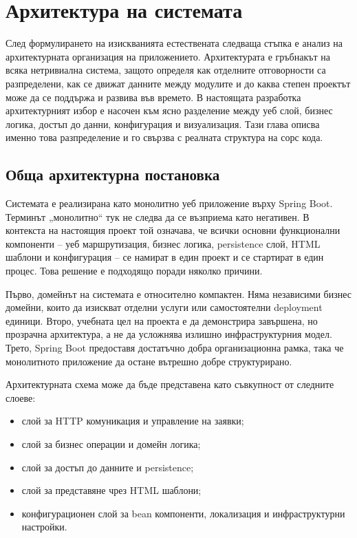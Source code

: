\section{Архитектура на системата}

След формулирането на изискванията естествената следваща стъпка е анализ на архитектурната организация на приложението. Архитектурата е гръбнакът на всяка нетривиална система, защото определя как отделните отговорности са разпределени, как се движат данните между модулите и до каква степен проектът може да се поддържа и развива във времето. В настоящата разработка архитектурният избор е насочен към ясно разделение между уеб слой, бизнес логика, достъп до данни, конфигурация и визуализация. Тази глава описва именно това разпределение и го свързва с реалната структура на сорс кода.

\subsection{Обща архитектурна постановка}

Системата е реализирана като монолитно уеб приложение върху Spring Boot. Терминът „монолитно“ тук не следва да се възприема като негативен. В контекста на настоящия проект той означава, че всички основни функционални компоненти -- уеб маршрутизация, бизнес логика, persistence слой, HTML шаблони и конфигурация -- се намират в един проект и се стартират в един процес. Това решение е подходящо поради няколко причини.

Първо, домейнът на системата е относително компактен. Няма независими бизнес домейни, които да изискват отделни услуги или самостоятелни deployment единици. Второ, учебната цел на проекта е да демонстрира завършена, но прозрачна архитектура, а не да усложнява излишно инфраструктурния модел. Трето, Spring Boot предоставя достатъчно добра организационна рамка, така че монолитното приложение да остане вътрешно добре структурирано.

Архитектурната схема може да бъде представена като съвкупност от следните слоеве:

\begin{itemize}[leftmargin=*]
    \item слой за HTTP комуникация и управление на заявки;
    \item слой за бизнес операции и домейн логика;
    \item слой за достъп до данните и persistence;
    \item слой за представяне чрез HTML шаблони;
    \item конфигурационен слой за bean компоненти, локализация и инфраструктурни настройки.
\end{itemize}

